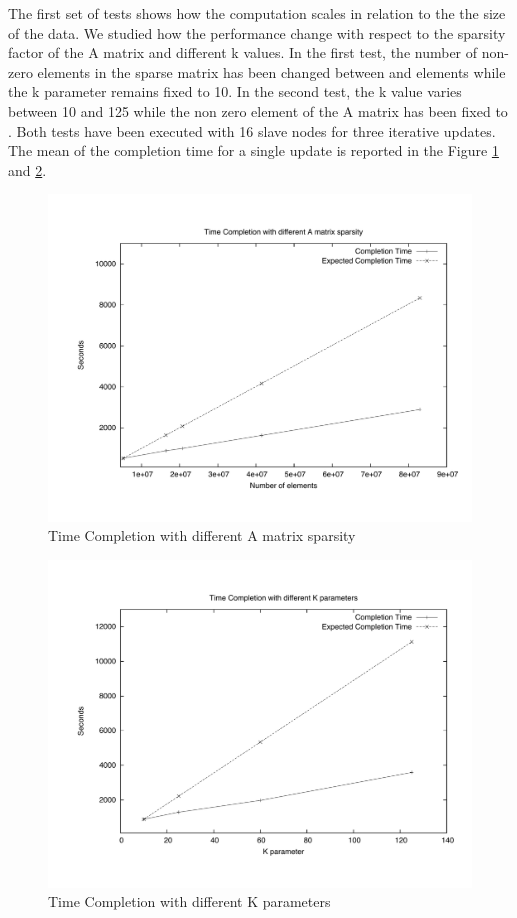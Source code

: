 The first set of tests shows how the computation scales in relation to the the size of the data. 
We studied how the performance change with respect to the sparsity factor of the A matrix and different k values. 
In the first test, the number of non-zero elements in the sparse matrix has been changed between  and  elements while the k parameter remains fixed to 10. 
In the second test, the k value varies between 10 and 125 while the non zero element of the A matrix has been fixed to .  
Both tests have been executed with 16 slave nodes for three iterative updates. 
The mean of the completion time for a single update is reported in the Figure \ref{DeltaVar}  and \ref{kVar}. 

\begin{figure}[th]
	\centerline{
		\mbox{\includegraphics[scale=0.48]{HadoopTest/PsFiles/DeltaVar.pdf}}
	}
	\caption{Time Completion with different A matrix sparsity} 
        \label{DeltaVar}
\end{figure}

\begin{figure}[th]
	\centerline{
		\mbox{\includegraphics[scale=0.48]{HadoopTest/PsFiles/kVar.pdf}}
	}
	\caption{Time Completion with different K parameters} 
        \label{kVar}
\end{figure}


